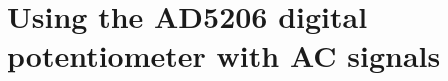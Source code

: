 \documentclass{article}
\begin{document}
    \section*{Using the AD5206 digital potentiometer with AC signals}
\end{document}
